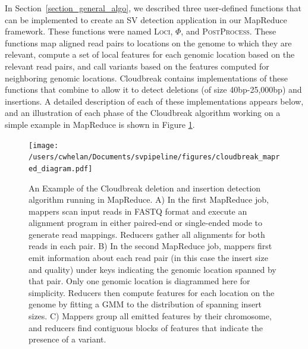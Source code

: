 In Section~\ref{section_general_algo}, we described three user-defined functions that can be implemented to create an SV detection application in our MapReduce framework. These functions were named \textsc{Loci}, $\Phi$, and \textsc{PostProcess}. These functions map aligned read pairs to locations on the genome to which they are relevant, compute a set of local features for each genomic location based on the relevant read pairs, and call variants based on the features computed for neighboring genomic locations. Cloudbreak contains implementations of these functions that combine to allow it to detect deletions (of size 40bp-25,000bp) and insertions. A detailed description of each of these implementations appears below, and an illustration of each phase of the Cloudbreak algorithm working on a simple example in MapReduce is shown in Figure \ref{cloudbreak_example}.

\begin{figure}
\centering
\texttt{[image: /users/cwhelan/Documents/svpipeline/figures/cloudbreak\_mapred\_diagram.pdf]}
\caption{An Example of the Cloudbreak deletion and insertion detection algorithm running in MapReduce. A) In the first MapReduce job, mappers scan input reads in FASTQ format and execute an alignment program in either paired-end or single-ended mode to generate read mappings. Reducers gather all alignments for both reads in each pair. B) In the second MapReduce job, mappers first emit information about each read pair (in this case the insert size and quality) under keys indicating the genomic location spanned by that pair. Only one genomic location is diagrammed here for simplicity. Reducers then compute features for each location on the genome by fitting a GMM to the distribution of spanning insert sizes. C) Mappers group all emitted features by their chromosome, and reducers find contiguous blocks of features that indicate the presence of a variant.}
\label{cloudbreak_example}
\end{figure}

